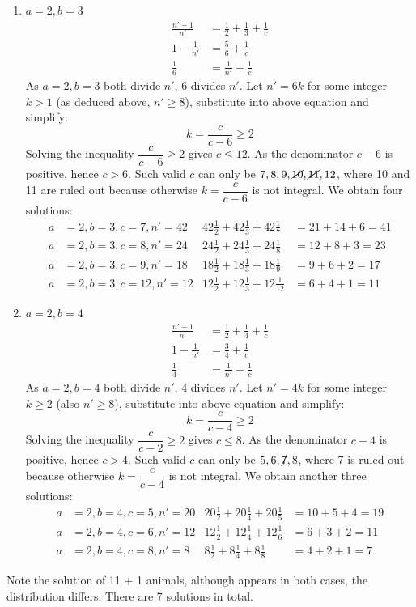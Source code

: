 \documentclass[b5paper]{article}
\begin{document}
\begin{Answer}[ref={ex:fractions}]
{\begin{enumerate}[{Case}1)]
\item $a = 2, b = 3$
  \begin{align*}
    \frac{n'-1}{n'} &= \frac{1}{2} + \frac{1}{3} + \frac{1}{c} \\
    1 - \frac{1}{n'} &= \frac{5}{6} + \frac{1}{c} \\
    \frac{1}{6} &= \frac{1}{n'} + \frac{1}{c}
  \end{align*}
  As $a = 2, b = 3$ both divide $n'$, 6 divides $n'$. Let $n' = 6k$ for some integer $k > 1$ (as deduced above, $n' \geq 8$), substitute into above equation and simplify:
  \[
  k = \frac{c}{c - 6} \geq 2
  \]
  Solving the inequality $\dfrac{c}{c - 6} \geq 2$ gives $c \leq 12$. As the denominator $c-6$ is positive, hence $c > 6$. Such valid $c$ can only be $7, 8, 9, \cancel{10}, \cancel{11}, 12$, where 10 and 11 are ruled out because otherwise $k = \dfrac{c}{c - 6}$ is not integral. We obtain four solutions:
  \begin{align*}
  a &= 2, b = 3, c = 7, n' = 42 & 42\frac{1}{2} + 42\frac{1}{3} + 42\frac{1}{7} &= 21 + 14 + 6 = 41 \\
  a &= 2, b = 3, c = 8, n' = 24 & 24\frac{1}{2} + 24\frac{1}{3} + 24\frac{1}{8} &= 12 + 8 + 3 = 23 \\
  a &= 2, b = 3, c = 9, n' = 18 & 18\frac{1}{2} + 18\frac{1}{3} + 18\frac{1}{9} &= 9 + 6 + 2 = 17 \\
  a &= 2, b = 3, c = 12, n' = 12 & 12\frac{1}{2} + 12\frac{1}{3} + 12\frac{1}{12} &= 6 + 4 + 1 = 11
  \end{align*}
\item $a = 2, b = 4$
  \begin{align*}
    \frac{n'-1}{n'} &= \frac{1}{2} + \frac{1}{4} + \frac{1}{c} \\
    1 - \frac{1}{n'} &= \frac{3}{4} + \frac{1}{c} \\
    \frac{1}{4} &= \frac{1}{n'} + \frac{1}{c}
  \end{align*}
  As $a = 2, b = 4$ both divide $n'$, 4 divides $n'$. Let $n' = 4k$ for some integer $k \geq 2 $ (also $n' \geq 8$), substitute into above equation and simplify:
  \[
  k = \frac{c}{c - 4} \geq 2
  \]
  Solving the inequality $\dfrac{c}{c - 2} \geq 2$ gives $c \leq 8$. As the denominator $c-4$ is positive, hence $c > 4$. Such valid $c$ can only be $5, 6, \cancel{7}, 8$, where 7 is ruled out because otherwise $k = \dfrac{c}{c - 4}$ is not integral. We obtain another three solutions:
  \begin{align*}
  a &= 2, b = 4, c = 5, n' = 20 & 20\frac{1}{2} + 20\frac{1}{4} + 20\frac{1}{5} &= 10 + 5 + 4 = 19 \\
  a &= 2, b = 4, c = 6, n' = 12 & 12\frac{1}{2} + 12\frac{1}{4} + 12\frac{1}{6} &= 6 + 3 + 2 = 11 \\
  a &= 2, b = 4, c = 8, n' = 8 & 8\frac{1}{2} + 8\frac{1}{4} + 8\frac{1}{8} &= 4 + 2 + 1 = 7
  \end{align*}
\end{enumerate}
Note the solution of 11 + 1 animals, although appears in both cases, the distribution differs. There are 7 solutions in total.

}
\end{Answer}
\end{document}
